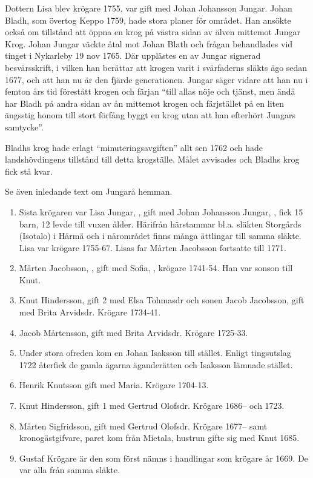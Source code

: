 Dottern Lisa blev krögare 1755, var gift med Johan Johansson Jungar. Johan Bladh, som övertog Keppo 1759, hade stora planer för området. Han ansökte också om tillstånd att öppna en krog på västra sidan av älven mittemot Jungar Krog. Johan Jungar väckte åtal mot Johan Blath och frågan behandlades vid tinget i Nykarleby 19 nov 1765. Där upplästes en av Jungar signerad besvärsskrift, i vilken han berättar att krogen varit i svärfaderns släkts ägo sedan 1677, och att han nu är den fjärde generationen. Jungar säger vidare att han nu i femton års tid förestått krogen och färjan ``till allas nöje och tjänst, men ändå har Bladh på andra sidan av ån mittemot krogen och färjstället på en liten ängsstig honom till stort förfång byggt en krog utan att han efterhört Jungars samtycke''.

Bladhs krog hade erlagt ``minuteringsavgiften'' allt sen 1762 och hade landshövdingens tillstånd till detta krogställe. Målet avvisades och Bladhs krog fick stå kvar.




Se även inledande text om Jungarå hemman.

\begin{enumerate}
  \item Sista krögaren var Lisa Jungar, , gift med Johan Johansson Jungar, , fick 15 barn, 12 levde till vuxen ålder. Härifrån härstammar bl.a. släkten  Storgårds (Isotalo) i Härmä och i närområdet finns många ättlingar till samma släkte. Lisa var krögare 1755-67. Lisas far Mårten Jacobsson fortsatte till 1771.
  \item Mårten Jacobsson, , gift med Sofia, , krögare 1741-54. Han var sonson till Knut.
  \item Knut Hindersson, gift 2 med Elsa Tohmasdr och sonen Jacob Jacobsson, gift med Brita Arvidsdr. Krögare 1734-41.
  \item Jacob Mårtensson, gift med Brita Arvidsdr. Krögare 1725-33.
  \item Under stora ofreden kom en Johan Isaksson till stället. Enligt tingsutslag 1722 återfick de gamla ägarna äganderätten och Isaksson lämnade stället.
  \item Henrik Knutsson gift med Maria. Krögare 1704-13.
  \item Knut Hindersson, gift 1 med Gertrud Olofsdr. Krögare 1686-- och 1723.
  \item Mårten Sigfridsson, gift med Gertrud Olofsdr. Krögare 1677-- samt kronogästgifvare, paret kom från Mietala, hustrun gifte sig med Knut 1685.
  \item Gustaf Krögare är den som först nämns i handlingar som krögare år 1669. De var alla från samma släkte.
\end{enumerate}

